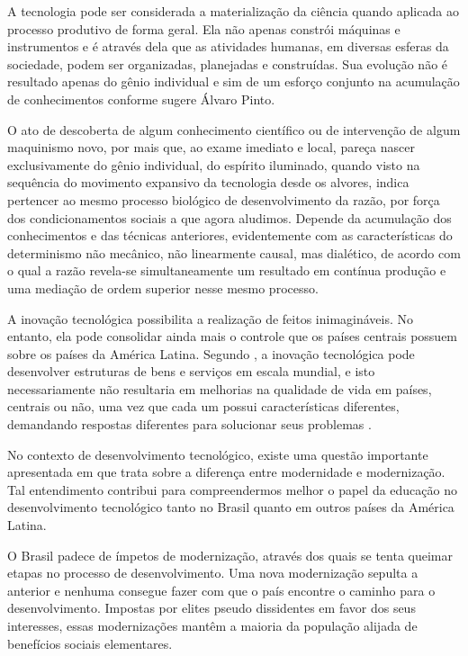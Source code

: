 A tecnologia pode ser considerada a materialização da ciência quando aplicada ao processo produtivo de forma geral. Ela não apenas constrói máquinas e instrumentos e é através dela que as atividades humanas, em diversas esferas da sociedade, podem ser organizadas, planejadas e construídas. Sua evolução não é resultado apenas do gênio individual e sim de um esforço conjunto na acumulação de conhecimentos conforme sugere Álvaro Pinto.

\begin{citacao}
O ato de descoberta de algum conhecimento científico ou de intervenção de algum maquinismo novo, por mais que, ao exame imediato e local, pareça nascer exclusivamente do gênio individual, do espírito iluminado, quando visto na sequência do movimento expansivo da tecnologia desde os alvores, indica pertencer ao mesmo processo biológico de desenvolvimento da razão, por força dos condicionamentos sociais a que agora aludimos. Depende da acumulação dos conhecimentos e das técnicas anteriores, evidentemente com as características do determinismo não mecânico, não linearmente causal, mas dialético, de acordo com o qual a razão revela-se simultaneamente um resultado em contínua produção e uma mediação de ordem superior nesse mesmo processo. \cite{vieira2005conceito}
\end{citacao}

A inovação tecnológica possibilita a realização de feitos inimagináveis. No entanto, ela pode consolidar ainda mais o controle que os países centrais possuem sobre os países da América Latina. Segundo \cite{freeman1975teoria}, a inovação tecnológica pode desenvolver estruturas de bens e serviços em escala mundial, e isto necessariamente não resultaria em melhorias na qualidade de vida em países, centrais ou não, uma vez que cada um possui características diferentes, demandando respostas diferentes para solucionar seus problemas \cite{leme2019maquina}.

No contexto de desenvolvimento tecnológico, existe uma questão importante apresentada em \cite{faoro1992questao} que trata sobre a diferença entre modernidade e modernização. Tal entendimento contribui para compreendermos melhor o papel da educação no desenvolvimento tecnológico tanto no Brasil quanto em outros países da América Latina.

\begin{citacao}
 O Brasil padece de ímpetos de modernização, através dos quais se tenta queimar etapas no processo de desenvolvimento. Uma nova modernização sepulta a anterior e nenhuma consegue fazer com que o país encontre o caminho para o desenvolvimento. Impostas por elites pseudo dissidentes em favor dos seus interesses, essas modernizações mantêm a maioria da população alijada de benefícios sociais elementares. \cite{faoro1992questao}
\end{citacao}

